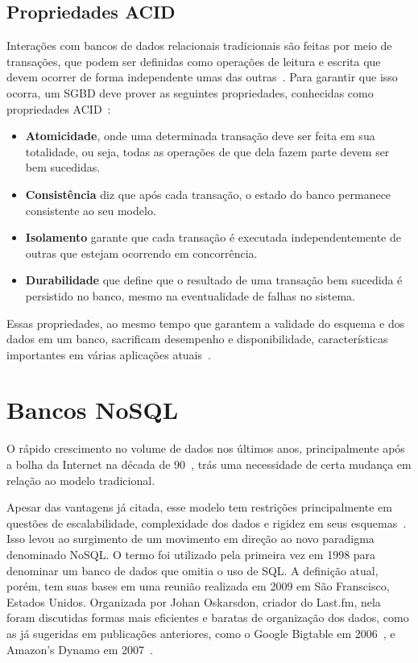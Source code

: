 \subsection{Propriedades ACID}
	Interações com bancos de dados relacionais tradicionais são feitas por meio de transações, que podem ser definidas como operações de leitura e escrita que devem ocorrer de forma independente umas das outras~\cite{dmsbook}. Para garantir que isso ocorra, um SGBD deve prover as seguintes propriedades, conhecidas como propriedades ACID~\cite{haerder}:
	\begin{itemize}
	\item \textbf{Atomicidade}, onde uma determinada transação deve ser feita em sua totalidade, ou seja, todas as operações de que dela fazem parte devem ser bem sucedidas.
	\item \textbf{Consistência} diz que após cada transação, o estado do banco permanece consistente ao seu modelo.
	\item \textbf{Isolamento} garante que cada transação é executada independentemente de outras que estejam ocorrendo em concorrência.
	\item \textbf{Durabilidade} que define que o resultado de uma transação bem sucedida é persistido no banco, mesmo na eventualidade de falhas no sistema.
	\end{itemize}

	Essas propriedades, ao mesmo tempo que garantem a validade do esquema e dos dados em um banco, sacrificam desempenho e disponibilidade, características importantes em várias aplicações atuais~\cite{foxcluster}.

\section{Bancos NoSQL}
    O rápido crescimento no volume de dados nos últimos anos, principalmente após a bolha da Internet na década de 90~\cite{pramod}, trás uma necessidade de certa mudança em relação ao modelo tradicional.
    
    Apesar das vantagens já citada, esse modelo tem restrições principalmente em questões de escalabilidade, complexidade dos dados e rigidez em seus esquemas~\cite{leavitt2010nosql}. Isso levou ao surgimento de um movimento em direção ao novo paradigma denominado NoSQL. O termo foi utilizado pela primeira vez em 1998 para denominar um banco de dados que omitia o uso de SQL. A definição atual, porém, tem suas bases em uma reunião realizada em 2009 em São Franscisco, Estados Unidos. Organizada por Johan Oskarsdon, criador do Last.fm, nela foram discutidas formas mais eficientes e baratas de organização dos dados, como as já sugeridas em publicações anteriores, como o Google Bigtable em 2006~\cite{bigtable}, e Amazon's Dynamo em 2007~\cite{dynamo, chrisnosql}.
